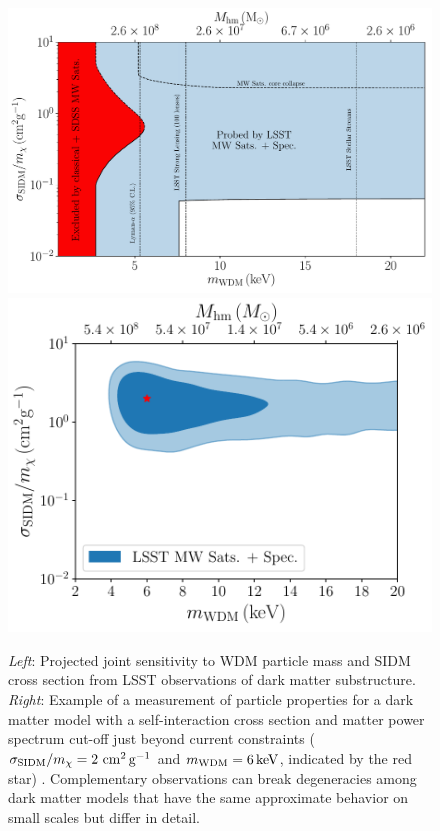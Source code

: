 \documentclass[12pt]{article}
\begin{document}
\begin{figure}[t]
\centering
\includegraphics[width=0.53\columnwidth]{figures/SIDM_WDM_figw_coll.pdf}
\includegraphics[width=0.46\columnwidth]{figures/WDM_SIDM_discovery_test.pdf}
\caption{\emph{Left}: Projected joint sensitivity to WDM particle mass and SIDM cross section from LSST observations of dark matter substructure. 
\emph{Right}: Example of a measurement of particle properties for a dark matter model with a self-interaction cross section and matter power spectrum cut-off just beyond current constraints ($\sigma_{\rm SIDM}/m_\chi = 2 \mathrm{\,\mathrm{\,cm}^2\mathrm{\,g}^{-1}}$ and $m_{\rm WDM} = 6\mathrm{\,keV}$, indicated by the red star) \citep{drlica-wagner_2019_lsst_dark_matter}. Complementary observations can break degeneracies among dark matter models that have the same approximate behavior on small scales but differ in detail.}
\end{figure}
\end{document}
